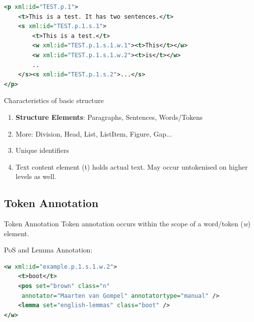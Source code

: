 \documentclass[compress,10pt]{beamer}
\begin{document}
\begin{frame}[fragile]
	\begin{example}
\begin{lstlisting}[language=xml]
<p xml:id="TEST.p.1">
	<t>This is a test. It has two sentences.</t>
	<s xml:id="TEST.p.1.s.1">        
	    <t>This is a test.</t>
	    <w xml:id="TEST.p.1.s.1.w.1"><t>This</t></w>
	    <w xml:id="TEST.p.1.s.1.w.2"><t>is</t></w>
	    ..
	</s><s xml:id="TEST.p.1.s.2">...</s>                
</p>                
\end{lstlisting}    
	\end{example}

    \begin{block}{Characteristics of basic structure}
      \begin{enumerate}
        \item \textbf{Structure Elements}: Paragraphs, Sentences, Words/Tokens  
        \item More: Division, Head, List, ListItem, Figure, Gap...
        \item Unique identifiers
        \item Text content element (t) holds actual text. May occur untokenised on higher levels as well.
      \end{enumerate}
    \end{block}
\end{frame}


\subsection{Token Annotation}

\begin{frame}[fragile]
    \begin{block}{Token Annotation}
        Token annotation occurs within the scope of a word/token (\emph{w}) element.
    \end{block}
    \begin{example}
       PoS and Lemma Annotation:
\begin{lstlisting}[language=xml]
<w xml:id="example.p.1.s.1.w.2">
    <t>boot</t>
    <pos set="brown" class="n" 
     annotator="Maarten van Gompel" annotatortype="manual" />
    <lemma set="english-lemmas" class="boot" />
</w>                         
\end{lstlisting}        
    \end{example}
\end{frame}
\end{document}
